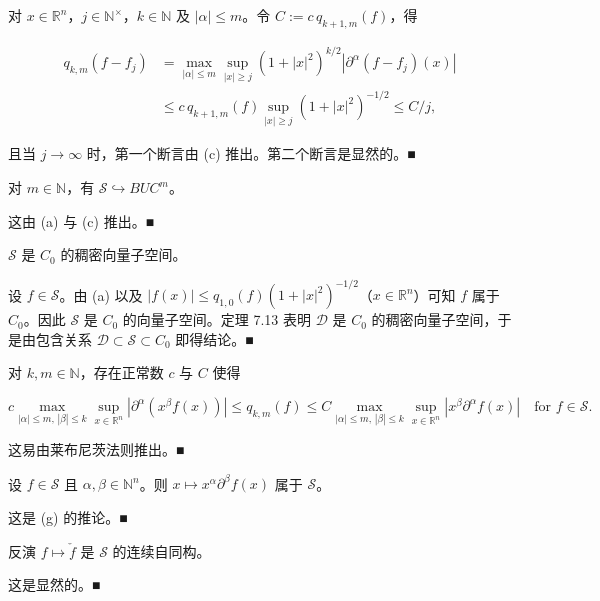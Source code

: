 \begin{remark}
\begin{items}
对 $ x \in \mathbb{R}^n $，$ j \in \mathbb{N}^{\times} $，$ k \in \mathbb{N} $ 及 $ |\alpha| \le m $。令 $ C := c\,q_{k+1,m}(f) $，得

\begin{equation*}
\begin{aligned}
q_{k,m}(f-f_j) &= \max_{|\alpha| \le m}\sup_{|x| \ge j}(1+|x|^2)^{k/2}|\partial^{\alpha}(f-f_j)(x)| \\ &\le c\,q_{k+1,m}(f)\sup_{|x| \ge j}(1+|x|^2)^{-1/2} \le C/j ,
\end{aligned}
\end{equation*}

且当 $ j \to \infty $ 时，第一个断言由 (c) 推出。第二个断言是显然的。\nobreak\hspace{0.35em}■

\item

对 $ m \in \mathbb{N} $，有 $ \mathcal{S} \hookrightarrow BUC^m $。

\proofhead
这由 (a) 与 (c) 推出。\nobreak\hspace{0.35em}■
\item

$ \mathcal{S} $ 是 $ C_0 $ 的稠密向量子空间。

\proofhead
设 $ f \in \mathcal{S} $。由 (a) 以及 $ |f(x)| \le q_{1,0}(f)(1+|x|^2)^{-1/2} $（$ x \in \mathbb{R}^n $）可知 $ f $ 属于 $ C_0 $。因此 $ \mathcal{S} $ 是 $ C_0 $ 的向量子空间。定理 7.13 表明 $ \mathcal{D} $ 是 $ C_0 $ 的稠密向量子空间，于是由包含关系 $ \mathcal{D} \subset \mathcal{S} \subset C_0 $ 即得结论。\nobreak\hspace{0.35em}■
\item

对 $ k,m \in \mathbb{N} $，存在正常数 $ c $ 与 $ C $ 使得

\[
c\max_{|\alpha| \le m,\,|\beta| \le k}\sup_{x \in \mathbb{R}^n}|\partial^{\alpha}(x^{\beta}f(x))| \le q_{k,m}(f) \le C\max_{|\alpha| \le m,\,|\beta| \le k}\sup_{x \in \mathbb{R}^n}|x^{\beta}\partial^{\alpha}f(x)| \quad \text{for } f \in \mathcal{S} .
\]

\proofhead
这易由莱布尼茨法则推出。\nobreak\hspace{0.35em}■
\item

设 $ f \in \mathcal{S} $ 且 $ \alpha,\beta \in \mathbb{N}^n $。则 $ x \mapsto x^{\alpha}\partial^{\beta}f(x) $ 属于 $ \mathcal{S} $。

\proofhead
这是 (g) 的推论。\nobreak\hspace{0.35em}■
\item

反演 $ f \mapsto \check{f} $ 是 $ \mathcal{S} $ 的连续自同构。

\proofhead
这是显然的。\nobreak\hspace{0.35em}■
\end{items}

\end{remark}


